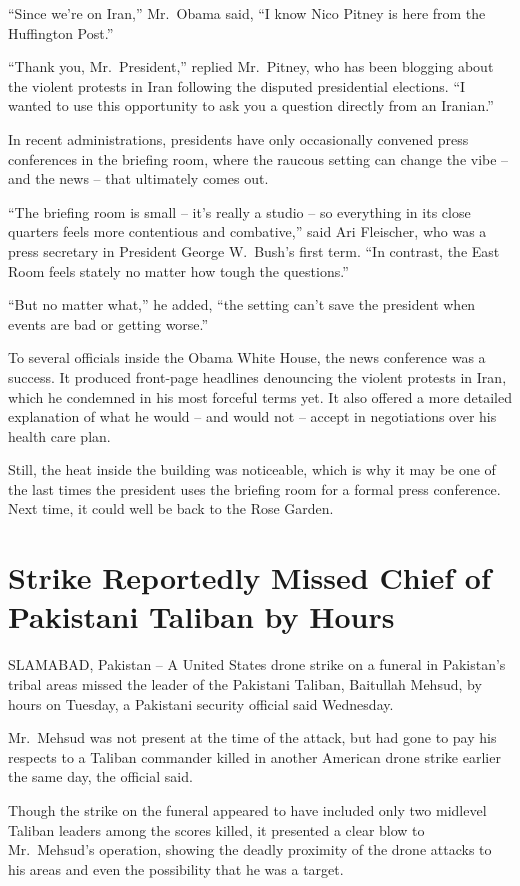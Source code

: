﻿\documentclass[12pt]{article}
\begin{document}
``Since we're on Iran,'' Mr.~Obama said, ``I know Nico Pitney is here from the Huffington Post.''

``Thank you, Mr.~President,'' replied Mr.~Pitney, who has been blogging about the violent protests
in Iran following the disputed presidential elections. ``I wanted to use this opportunity to ask you
a question directly from an Iranian.''

In recent administrations, presidents have only occasionally convened press conferences in the
briefing room, where the raucous setting can change the vibe -- and the news -- that ultimately
comes out.

``The briefing room is small -- it's really a studio -- so everything in its close quarters feels
more contentious and combative,'' said Ari Fleischer, who was a press secretary in President George
W.~Bush's first term. ``In contrast, the East Room feels stately no matter how tough the
questions.''

``But no matter what,'' he added, ``the setting can't save the president when events are bad or
getting worse.''

To several officials inside the Obama White House, the news conference was a success. It produced
front-page headlines denouncing the violent protests in Iran, which he condemned in his most
forceful terms yet. It also offered a more detailed explanation of what he would -- and would not --
accept in negotiations over his health care plan.

Still, the heat inside the building was noticeable, which is why it may be one of the last times the
president uses the briefing room for a formal press conference. Next time, it could well be back to
the Rose Garden.

\section{Strike Reportedly Missed Chief of Pakistani Taliban by Hours}

SLAMABAD, Pakistan -- A United States drone strike on a funeral in Pakistan's tribal areas missed
the leader of the Pakistani Taliban, Baitullah Mehsud, by hours on Tuesday, a Pakistani security
official said Wednesday.

Mr.~Mehsud was not present at the time of the attack, but had gone to pay his respects to a Taliban
commander killed in another American drone strike earlier the same day, the official said.

Though the strike on the funeral appeared to have included only two midlevel Taliban leaders among
the scores killed, it presented a clear blow to Mr.~Mehsud's operation, showing the deadly proximity
of the drone attacks to his areas and even the possibility that he was a target.
\end{document}
